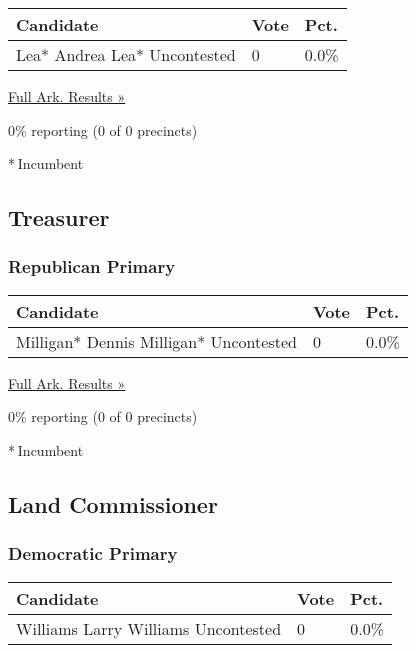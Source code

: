 \begin{longtable}[]{@{}lll@{}}
\toprule
Candidate & Vote & Pct.\tabularnewline
\midrule
\endhead
 Lea* Andrea Lea* Uncontested & 0 & 0.0\%\tabularnewline
\bottomrule
\end{longtable}

\href{https://www.nytimes3xbfgragh.onion/elections/results/arkansas}{Full
Ark. Results »}

0\% reporting (0 of 0 precincts)

* Incumbent

\hypertarget{treasurer}{%
\subsection{Treasurer}\label{treasurer}}

\hypertarget{republican-primary-9}{%
\subsubsection{Republican Primary}\label{republican-primary-9}}

\begin{longtable}[]{@{}lll@{}}
\toprule
Candidate & Vote & Pct.\tabularnewline
\midrule
\endhead
 Milligan* Dennis Milligan* Uncontested & 0 & 0.0\%\tabularnewline
\bottomrule
\end{longtable}

\href{https://www.nytimes3xbfgragh.onion/elections/results/arkansas}{Full
Ark. Results »}

0\% reporting (0 of 0 precincts)

* Incumbent

\hypertarget{land-commissioner}{%
\subsection{Land Commissioner}\label{land-commissioner}}

\hypertarget{democratic-primary-8}{%
\subsubsection{Democratic Primary}\label{democratic-primary-8}}

\begin{longtable}[]{@{}lll@{}}
\toprule
Candidate & Vote & Pct.\tabularnewline
\midrule
\endhead
 Williams Larry Williams Uncontested & 0 & 0.0\%\tabularnewline
\bottomrule
\end{longtable}

